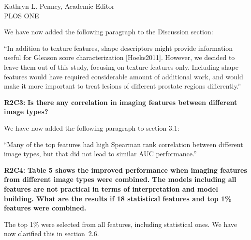 \documentclass{letter}
\newenvironment{comment}[1]%
  {\vspace{5ex}\par\textbf{#1:}\ignorespaces\bfseries}%
  {\par\ignorespacesafterend}
\newenvironment{reply}%
  {\vspace{2ex}\par}%
  {\par\upshape}
\providecommand{\citep}[1]{[#1]}
\begin{document}
\begin{letter}{Kathryn L. Penney, Academic Editor \\ PLOS ONE}
\begin{reply}
We have now added the following paragraph to the Discussion section:

``In addition to texture features, shape descriptors might provide information
useful for Gleason score characterization \citep{Hoeks2011}. However, we decided
to leave them out of this study, focusing on texture features only. Including
shape features would have required considerable amount of additional work, and
would make it more important to treat lesions of different prostate regions
differently.''

\end{reply}


\begin{comment}{R2C3}
Is there any correlation in imaging features between different image types?
\end{comment}

\begin{reply}
We have now added the following paragraph to section 3.1:

``Many of the top features had high Spearman rank correlation between different
image types, but that did not lead to similar AUC performance.''
\end{reply}


\begin{comment}{R2C4}
Table 5 shows the improved performance when imaging features from different
image types were combined. The models including all features are not practical
in terms of interpretation and model building. What are the results if 18
statistical features and top 1\% features were combined.
\end{comment}

\begin{reply}
The top 1\% were selected from all features, including statistical ones. We have
now clarified this in section~2.6.
\end{reply}



\end{letter}
\end{document}
